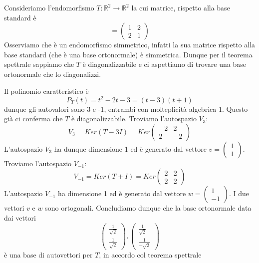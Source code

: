 \begin{example}
	Consideriamo l'endomorfismo $T : \mathbb{R}^2 \to \mathbb{R}^2$ la cui matrice,
	rispetto alla base standard \`e
	\begin{equation*}
		[T] = \begin{pmatrix}
			1 & 2 \\
			2 & 1
		\end{pmatrix}
	\end{equation*}
	Osserviamo che \`e un endomorfismo simmetrico, infatti la sua matrice rispetto
	alla base standard (che \`e una base ortonormale) \`e simmetrica. Dunque per
	il teorema spettrale sappiamo che $T$ \`e diagonalizzabile e ci aspettiamo di
	trovare una base ortonormale che lo diagonalizzi.

	Il polinomio caratteristico \`e
	\begin{equation*}
		P_T(t) = t^2 - 2t - 3 = (t - 3)(t + 1)
	\end{equation*}
	dunque gli autovalori sono 3 e -1, entrambi con molteplicit\`a algebrica 1.
	Questo gi\`a ci conferma che $T$ \`e diagonalizzabile. Troviamo l'autospazio
	$V_3$:
	\begin{equation*}
		V_3 = Ker(T - 3I) = Ker \begin{pmatrix}
			-2 & 2  \\
			2  & -2
		\end{pmatrix}
	\end{equation*}
	L'autospazio $V_3$ ha dunque dimensione 1 ed \`e generato dal vettore
	$v = \begin{pmatrix} 1 \\ 1	\end{pmatrix}$. Troviamo l'autospazio $V_{-1}$:
	\begin{equation*}
		V_{-1} = Ker(T + I) = Ker \begin{pmatrix}
			2 & 2 \\
			2 & 2
		\end{pmatrix}
	\end{equation*}
	L'autospazio $V_{-1}$ ha dimensione 1 ed \`e generato dal vettore
	$w = \begin{pmatrix} 1 \\ -1 \end{pmatrix}$. I due vettori $v$ e $w$ sono
	ortogonali. Concludiamo dunque che la base ortonormale data dai vettori
	\begin{equation*}
		\begin{pmatrix}
			\frac{1}{\sqrt{2}} \\ \frac{1}{\sqrt{2}}
		\end{pmatrix},
		\begin{pmatrix}
			\frac{1}{\sqrt{2}} \\ \frac{1}{-\sqrt{2}}
		\end{pmatrix}
	\end{equation*}
	\`e una base di autovettori per $T$, in accordo col teorema spettrale
\end{example}

